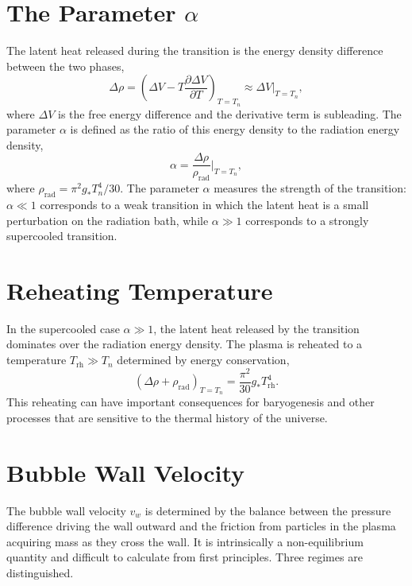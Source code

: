 \section{The Parameter \texorpdfstring{$\alpha$}{alpha}}

The latent heat released during the transition is the energy density
difference between the two phases,
\begin{equation}
	\Delta\rho = \left(\Delta V - T\frac{\partial\Delta V}{\partial T}
	\right)_{T=T_n}
	\approx \Delta V\big|_{T=T_n},
\end{equation}
where $\Delta V$ is the free energy difference and the derivative term
is subleading. The parameter $\alpha$ is defined as the ratio of this
energy density to the radiation energy density,
\begin{equation}
	\alpha = \frac{\Delta\rho}{\rho_{\text{rad}}}\bigg|_{T=T_n},
	\label{eq:alpha}
\end{equation}
where $\rho_{\text{rad}} = \pi^2 g_* T_n^4/30$. The parameter $\alpha$
measures the strength of the transition: $\alpha \ll 1$ corresponds to
a weak transition in which the latent heat is a small perturbation on
the radiation bath, while $\alpha \gg 1$ corresponds to a strongly
supercooled transition.


\section{Reheating Temperature}

In the supercooled case $\alpha \gg 1$, the latent heat released by
the transition dominates over the radiation energy density. The plasma
is reheated to a temperature $T_{\text{rh}} \gg T_n$ determined by
energy conservation,
\begin{equation}
	\left(\Delta\rho + \rho_{\text{rad}}\right)_{T=T_n}
	= \frac{\pi^2}{30}g_* T_{\text{rh}}^4.
\end{equation}
This reheating can have important consequences for baryogenesis and
other processes that are sensitive to the thermal history of the
universe.

\section{Bubble Wall Velocity}

The bubble wall velocity $v_w$ is determined by the balance between
the pressure difference driving the wall outward and the friction
from particles in the plasma acquiring mass as they cross the wall.
It is intrinsically a non-equilibrium quantity and difficult to
calculate from first principles. Three regimes are distinguished.

